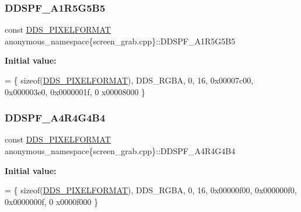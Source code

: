 \subsubsection{\texorpdfstring{D\+D\+S\+P\+F\+\_\+\+A1\+R5\+G5\+B5}{DDSPF\_A1R5G5B5}}
{\footnotesize\ttfamily const \mbox{\hyperlink{structanonymous__namespace_02screen__grab_8cpp_03_1_1_d_d_s___p_i_x_e_l_f_o_r_m_a_t}{D\+D\+S\+\_\+\+P\+I\+X\+E\+L\+F\+O\+R\+M\+AT}} anonymous\+\_\+namespace\{screen\+\_\+grab.\+cpp\}\+::D\+D\+S\+P\+F\+\_\+\+A1\+R5\+G5\+B5}

{\bfseries Initial value\+:}
\begin{DoxyCode}
=
        \{ \textcolor{keyword}{sizeof}(\mbox{\hyperlink{struct_d_d_s___p_i_x_e_l_f_o_r_m_a_t}{DDS\_PIXELFORMAT}}), DDS\_RGBA, 0, 16, 0x00007c00, 0x000003e0, 0x0000001f, 0
      x00008000 \}
\end{DoxyCode}
\mbox{\label{namespaceanonymous__namespace_02screen__grab_8cpp_03_a8fe8a116c1d8b35a9eb045eb38a0ca5f}} 
\subsubsection{\texorpdfstring{D\+D\+S\+P\+F\+\_\+\+A4\+R4\+G4\+B4}{DDSPF\_A4R4G4B4}}
{\footnotesize\ttfamily const \mbox{\hyperlink{structanonymous__namespace_02screen__grab_8cpp_03_1_1_d_d_s___p_i_x_e_l_f_o_r_m_a_t}{D\+D\+S\+\_\+\+P\+I\+X\+E\+L\+F\+O\+R\+M\+AT}} anonymous\+\_\+namespace\{screen\+\_\+grab.\+cpp\}\+::D\+D\+S\+P\+F\+\_\+\+A4\+R4\+G4\+B4}

{\bfseries Initial value\+:}
\begin{DoxyCode}
=
        \{ \textcolor{keyword}{sizeof}(\mbox{\hyperlink{struct_d_d_s___p_i_x_e_l_f_o_r_m_a_t}{DDS\_PIXELFORMAT}}), DDS\_RGBA, 0, 16, 0x00000f00, 0x000000f0, 0x0000000f, 0
      x0000f000 \}
\end{DoxyCode}
\mbox{\label{namespaceanonymous__namespace_02screen__grab_8cpp_03_a9d39e5d36724050f766893a0be2b8280}} 
